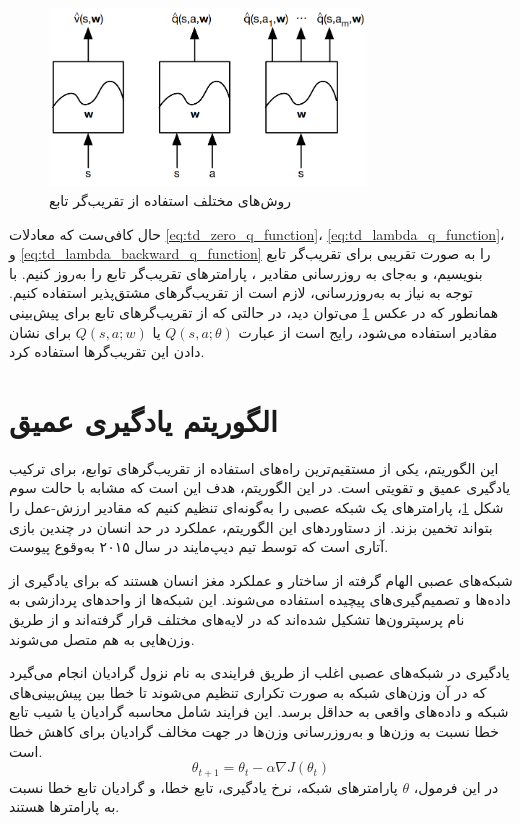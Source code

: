 \begin{figure}[H]
    \centering
    \includegraphics[width=0.75\textwidth]{images/function_approximators.png}
    \caption{روش‌های مختلف استفاده از تقریب‌گر تابع}\label{fig:func_approx}
\end{figure}
حال کافی‌ست که معادلات \ref{eq:td_zero_q_function}، \ref{eq:td_lambda_q_function}، و \ref{eq:td_lambda_backward_q_function} را به صورت تقریبی برای تقریب‌گر تابع بنویسیم،
و به‌جای به روزرسانی مقادیر ، پارامتر‌های تقریب‌گر تابع را به‌روز کنیم.
با توجه به نیاز به به‌روز‌رسانی، لازم است از تقریب‌گر‌های مشتق‌پذیر استفاده کنیم.
همانطور که در عکس \ref{fig:func_approx}
می‌توان دید، در حالتی که از تقریب‌گر‌های تابع برای پیش‌بینی مقادیر  استفاده می‌شود،
رایج است از عبارت 
$Q(s, a; \theta)$
یا $Q(s, a; w)$
برای نشان دادن این تقریب‌گر‌ها استفاده کرد.

\section{الگوریتم یادگیری  عمیق}
این الگوریتم، یکی از مستقیم‌ترین راه‌های استفاده از تقریب‌گر‌های توابع، برای ترکیب یادگیری عمیق و تقویتی است.
در این الگوریتم، هدف این است که مشابه با حالت سوم شکل \ref{fig:func_approx}،
پارامتر‌های یک شبکه عصبی را به‌گونه‌ای تنظیم کنیم که مقادیر ارزش-عمل را بتواند تخمین بزند.
از دستاورد‌های این الگوریتم، عملکرد در حد انسان در چندین بازی آتاری  است
که توسط تیم دیپ‌مایند 
در سال ۲۰۱۵ به‌وقوع پیوست.

شبکه‌های عصبی الهام گرفته از ساختار و عملکرد مغز انسان هستند که برای یادگیری از داده‌ها و تصمیم‌گیری‌های پیچیده استفاده می‌شوند.
 این شبکه‌ها از واحدهای پردازشی به نام پرسپترون‌ها تشکیل شده‌اند که در لایه‌های مختلف قرار گرفته‌اند و از طریق وزن‌هایی به هم متصل می‌شوند.
 
 یادگیری در شبکه‌های عصبی اغلب از طریق فرایندی به نام نزول گرادیان انجام می‌گیرد که در آن وزن‌های شبکه به صورت تکراری تنظیم می‌شوند تا خطا بین پیش‌بینی‌های شبکه و داده‌های واقعی به حداقل برسد. این فرایند شامل محاسبه گرادیان یا شیب تابع خطا نسبت به وزن‌ها و به‌روزرسانی وزن‌ها در جهت مخالف گرادیان برای کاهش خطا است.
\begin{equation}\label{eq:gradient_descent}
    \theta_{t+1} = \theta_t - \alpha \nabla J(\theta_t)
\end{equation}
در این فرمول، $\theta$
پارامتر‌های شبکه،
\lr{$\alpha$}
نرخ یادگیری،
تابع خطا، و
گرادیان تابع خطا نسبت به پارامتر‌ها هستند.

